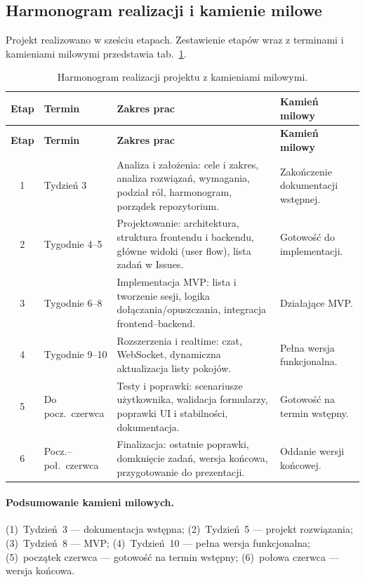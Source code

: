 \subsection{Harmonogram realizacji i kamienie milowe}

Projekt realizowano w sześciu etapach. Zestawienie etapów wraz z terminami i kamieniami
milowymi przedstawia tab.~\ref{tab:harmonogram}.

\renewcommand{\arraystretch}{1.3}
\begin{longtable}{@{}cp{}p{}p{}@{}}
\caption{Harmonogram realizacji projektu z kamieniami milowymi.}\label{tab:harmonogram}\\
\toprule
\textbf{Etap} & \textbf{Termin} & \textbf{Zakres prac} & \textbf{Kamień milowy} \\
\midrule
\endfirsthead
\toprule
\textbf{Etap} & \textbf{Termin} & \textbf{Zakres prac} & \textbf{Kamień milowy} \\
\midrule
\endhead
1 & Tydzień 3 & Analiza i założenia: cele i zakres, analiza rozwiązań, wymagania, podział ról, harmonogram, porządek repozytorium. & Zakończenie dokumentacji wstępnej. \\
2 & Tygodnie 4–5 & Projektowanie: architektura, struktura frontendu i backendu, główne widoki (user flow), lista zadań w Issues. & Gotowość do implementacji. \\
3 & Tygodnie 6–8 & Implementacja MVP: lista i tworzenie sesji, logika dołączania/opuszczania, integracja frontend–backend. & Działające MVP. \\
4 & Tygodnie 9–10 & Rozszerzenia i realtime: czat, WebSocket, dynamiczna aktualizacja listy pokojów. & Pełna wersja funkcjonalna. \\
5 & Do pocz.\ czerwca & Testy i poprawki: scenariusze użytkownika, walidacja formularzy, poprawki UI i stabilności, dokumentacja. & Gotowość na termin wstępny. \\
6 & Pocz.–poł.\ czerwca & Finalizacja: ostatnie poprawki, domknięcie zadań, wersja końcowa, przygotowanie do prezentacji. & Oddanie wersji końcowej. \\
\bottomrule
\end{longtable}

\paragraph{Podsumowanie kamieni milowych.}
(1)~Tydzień~3 — dokumentacja wstępna; (2)~Tydzień~5 — projekt rozwiązania;
(3)~Tydzień~8 — MVP; (4)~Tydzień~10 — pełna wersja funkcjonalna;
(5)~początek czerwca — gotowość na termin wstępny; (6)~połowa czerwca — wersja końcowa.


